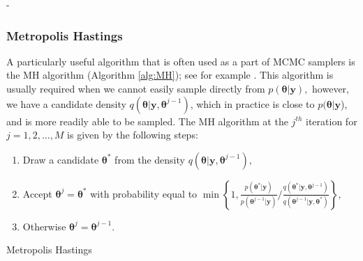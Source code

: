 -\documentclass[article]{jss}
\begin{document}
\subsubsection{Metropolis Hastings}
\label{sub:Metropolis-Hastings}

A particularly useful algorithm that is often used as a part of MCMC
samplers is the MH algorithm (Algorithm \ref{alg:MH}); see for example
\citet{RobertCassela1999}. This algorithm is usually required when we
cannot easily sample directly from $p(\bm{\theta}|\bm{y}),$ however,
we have a candidate density
$q(\bm{\theta}|\bm{y},\bm{\theta}^{j-1})$, which
in practice is close to $p(\bm{\theta}|\bm{y}$), and is more readily
able to be sampled. The MH algorithm at the $j^{th}$ iteration for
$j=1,2,\dots,M$ is given by the following steps:

%
\begin{algorithm}[H]
\begin{enumerate}
\item Draw a candidate $\bm{\bm{\theta}}^{\ast}$ from the density $q\left(\bm{\bm{\theta}}|\bm{y},\bm{\theta}^{j-1}\right),$ 
\item Accept $\bm{\theta}^{j}=\bm{\theta}^{\ast}$ with probability equal
to $\min\left\{ 1,\frac{p\left(\bm{\theta}^{\ast}|\bm{y}\right)}{p\left(\bm{\theta}^{j-1}|\bm{y}\right)}/\frac{q\left(\bm{\theta}^{\ast}|\bm{y},\bm{\theta}^{j-1}\right)}{q\left(\bm{\theta}^{j-1}|\bm{y},\bm{\theta}^{*}\right)}\right\} ,$ 
\item Otherwise $\bm{\theta}^{j}=\bm{\theta}^{j-1}.$ 
\end{enumerate}
\caption{Metropolis Hastings}
\label{alg:MH}
\end{algorithm}
\end{document}
